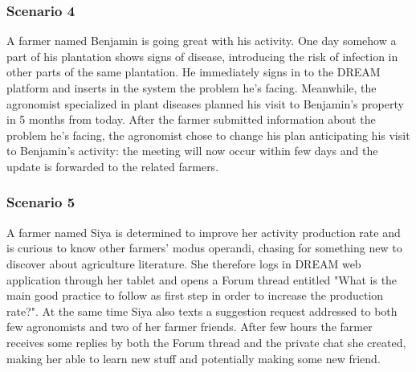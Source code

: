 \subsubsection*{Scenario 4}
A farmer named Benjamin is going great with his activity. One day somehow a part of his plantation shows signs of disease, introducing the risk of infection in other parts of the same plantation. He immediately signs in to the DREAM platform and inserts in the system the problem he's facing. Meanwhile, the agronomist specialized in plant diseases planned his visit to Benjamin's property in 5 months from today. After the farmer submitted information about the problem he's facing, the agronomist chose to change his plan anticipating his visit to Benjamin's activity: the meeting will now occur within few days and the update is forwarded to the related farmers.

\subsubsection*{Scenario 5}
A farmer named Siya is determined to improve her activity production rate and is curious to know other farmers' modus operandi, chasing for something new to discover about agriculture literature. She therefore logs in DREAM web application through her tablet and opens a Forum thread entitled "What is the main good practice to follow as first step in order to increase the production rate?". At the same time Siya also texts a suggestion request addressed to both few agronomists and two of her farmer friends. After few hours the farmer receives some replies by both the Forum thread and the private chat she created, making her able to learn new stuff and potentially making some new friend.


